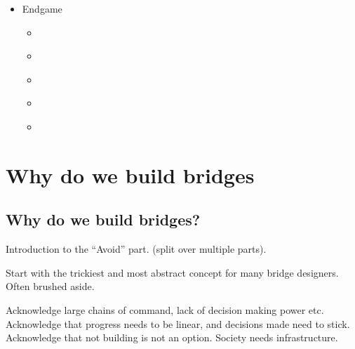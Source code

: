 \documentclass[letterpaper,10pt,english]{jupyterBook}
\begin{document}
\begin{itemize}
\item {} 
\sphinxAtStartPar
End\sphinxhyphen{}game

\begin{itemize}
\item {} 
\sphinxAtStartPar
{\hyperref[\detokenize{part5/conclusion::doc}]{}}

\item {} 
\sphinxAtStartPar
{\hyperref[\detokenize{part5/community_contribution::doc}]{}}

\item {} 
\sphinxAtStartPar
{\hyperref[\detokenize{part5/acknowledgements::doc}]{}}

\item {} 
\sphinxAtStartPar
{\hyperref[\detokenize{part5/glossary::doc}]{}}

\item {} 
\sphinxAtStartPar
{\hyperref[\detokenize{part5/genindex::doc}]{}}

\end{itemize}
\end{itemize}

\sphinxstepscope


\part{Why do we build bridges}

\sphinxstepscope


\chapter{Why do we build bridges?}
\label{\detokenize{part1/intro_avoid:why-do-we-build-bridges}}\label{\detokenize{part1/intro_avoid::doc}}
\sphinxAtStartPar
Introduction to the “Avoid” part. (split over multiple parts).

\sphinxAtStartPar
Start with the trickiest and most abstract concept for many bridge designers. Often brushed aside.

\sphinxAtStartPar
Acknowledge large chains of command, lack of decision making power etc. Acknowledge that progress needs to be linear, and decisions made need to stick. Acknowledge that not building is not an option. Society needs infrastructure.
\end{document}
